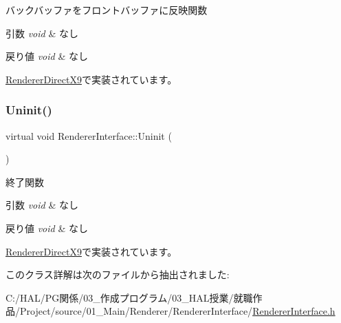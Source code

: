 バックバッファをフロントバッファに反映関数 


\begin{DoxyParams}{引数}
{\em void} & なし \\
\hline
\end{DoxyParams}

\begin{DoxyRetVals}{戻り値}
{\em void} & なし \\
\hline
\end{DoxyRetVals}


\mbox{\hyperlink{class_renderer_direct_x9_a77dbc76e8adbe4f9ee41c5f09e5ebe81}{Renderer\+Direct\+X9}}で実装されています。

\mbox{\label{class_renderer_interface_ada105489f9db98e7e9542b278699d558}} 
\subsubsection{\texorpdfstring{Uninit()}{Uninit()}}
{\footnotesize\ttfamily virtual void Renderer\+Interface\+::\+Uninit (\begin{DoxyParamCaption}{ }\end{DoxyParamCaption})\hspace{0.3cm}{\ttfamily [pure virtual]}}



終了関数 


\begin{DoxyParams}{引数}
{\em void} & なし \\
\hline
\end{DoxyParams}

\begin{DoxyRetVals}{戻り値}
{\em void} & なし \\
\hline
\end{DoxyRetVals}


\mbox{\hyperlink{class_renderer_direct_x9_af7ff314cbaa894d71e37c10565002f8f}{Renderer\+Direct\+X9}}で実装されています。



このクラス詳解は次のファイルから抽出されました\+:\begin{DoxyCompactItemize}
\item 
C\+:/\+H\+A\+L/\+P\+G関係/03\+\_\+作成プログラム/03\+\_\+\+H\+A\+L授業/就職作品/\+Project/source/01\+\_\+\+Main/\+Renderer/\+Renderer\+Interface/\mbox{\hyperlink{_renderer_interface_8h}{Renderer\+Interface.\+h}}\end{DoxyCompactItemize}
